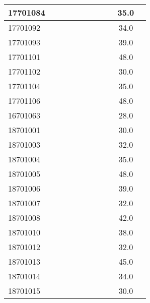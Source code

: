 \documentclass[12pt]{article}
\begin{document}
\begin{center}
\begin{small}
\begin{tabular}{|l|c|c|c|c|c|c|c|c|c|c|}
17701084 &  &  &  &  &  &  &  &  & 35.0\\ \hline 
17701092 &  &  &  &  &  &  &  &  & 34.0\\ \hline 
17701093 &  &  &  &  &  &  &  &  & 39.0\\ \hline 
17701101 &  &  &  &  &  &  &  &  & 48.0\\ \hline 
17701102 &  &  &  &  &  &  &  &  & 30.0\\ \hline 
17701104 &  &  &  &  &  &  &  &  & 35.0\\ \hline 
17701106 &  &  &  &  &  &  &  &  & 48.0\\ \hline 
16701063 &  &  &  &  &  &  &  &  & 28.0\\ \hline 
18701001 &  &  &  &  &  &  &  &  & 30.0\\ \hline 
18701003 &  &  &  &  &  &  &  &  & 32.0\\ \hline 
18701004 &  &  &  &  &  &  &  &  & 35.0\\ \hline 
18701005 &  &  &  &  &  &  &  &  & 48.0\\ \hline 
18701006 &  &  &  &  &  &  &  &  & 39.0\\ \hline 
18701007 &  &  &  &  &  &  &  &  & 32.0\\ \hline 
18701008 &  &  &  &  &  &  &  &  & 42.0\\ \hline 
18701010 &  &  &  &  &  &  &  &  & 38.0\\ \hline 
18701012 &  &  &  &  &  &  &  &  & 32.0\\ \hline 
18701013 &  &  &  &  &  &  &  &  & 45.0\\ \hline 
18701014 &  &  &  &  &  &  &  &  & 34.0\\ \hline 
18701015 &  &  &  &  &  &  &  &  & 30.0\\ \hline 
        \end{tabular}
            \end{small}
            \end{center}
  \centering
            
\end{document}

